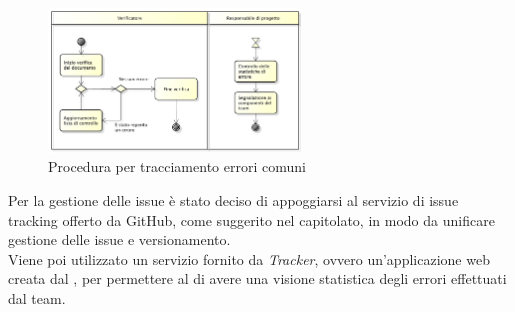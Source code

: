 					\begin{figure}[H]
							\centering
							\includegraphics[width=0.6\textwidth]{NormeDiProgetto/Pics/ProceduraDecrementoErrori}
							\caption{Procedura per tracciamento errori comuni}
					\end{figure}
			Per la gestione delle issue è stato deciso di appoggiarsi al servizio di issue tracking offerto da GitHub, come suggerito nel capitolato, in modo da unificare gestione delle issue e versionamento. \\
			Viene poi utilizzato un servizio fornito da \textit{Tracker}, ovvero un'applicazione web creata dal \groupname, per permettere al  di avere una visione statistica degli errori effettuati dal team.
